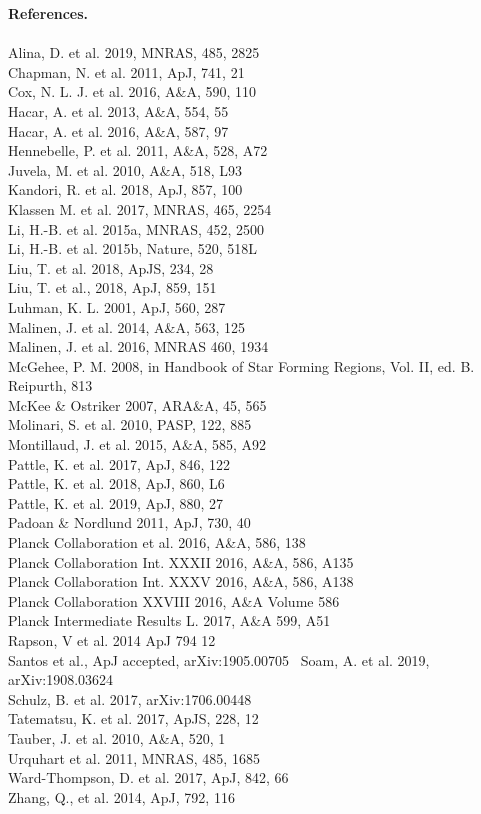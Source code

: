 \documentclass[11pt]{amsart}
\begin{document}
{{\bf References.} 
\\
\\
Alina, D. et al.  2019,  MNRAS, 485, 2825 \\
Chapman, N. et al. 2011, ApJ, 741, 21 \\
Cox, N. L. J. et al. 2016, A\&A, 590, 110 \\
Hacar, A. et al. 2013, A\&A, 554, 55 \\
Hacar, A. et al. 2016, A\&A, 587, 97 \\
Hennebelle, P. et al. 2011, A\&A, 528, A72 \\
Juvela, M.  et al. 2010, A\&A, 518, L93 \\
Kandori, R. et al. 2018, ApJ, 857, 100 \\
Klassen M. et al. 2017, MNRAS, 465, 2254 \\
Li, H.-B. et al. 2015a, MNRAS, 452, 2500 \\
Li, H.-B. et al. 2015b, Nature, 520, 518L \\
Liu, T. et al. 2018, ApJS, 234, 28 \\
Liu, T. et al., 2018,  ApJ, 859, 151 \\
Luhman, K. L. 2001, ApJ, 560, 287 \\
Malinen, J. et al. 2014, A\&A, 563, 125 \\
Malinen, J. et al. 2016, MNRAS 460, 1934 \\
McGehee, P. M. 2008, in Handbook of Star Forming Regions, Vol. II, ed. B. Reipurth, 813 \\
McKee \& Ostriker 2007, ARA\&A, 45, 565 \\
Molinari, S.  et al. 2010, PASP,  122, 885 \\
Montillaud, J. et al. 2015, A\&A, 585, A92 \\
Pattle, K.  et al. 2017, ApJ, 846, 122 \\
Pattle, K.  et al. 2018, ApJ, 860, L6 \\
Pattle, K. et al. 2019, ApJ, 880, 27 \\
Padoan \& Nordlund 2011, ApJ, 730, 40 \\
Planck Collaboration et al. 2016, A\&A, 586, 138 \\ 
Planck Collaboration Int. XXXII 2016, A\&A, 586, A135 \\
Planck Collaboration Int. XXXV 2016, A\&A, 586, A138 \\
Planck Collaboration XXVIII 2016, A\&A Volume 586 \\
Planck Intermediate Results L.  2017, A\&A 599, A51 \\
Rapson, V et al. 2014 ApJ 794 12 \\
Santos et al., ApJ accepted, arXiv:1905.00705 \
Soam, A. et al. 2019, arXiv:1908.03624\\
Schulz, B. et al. 2017, arXiv:1706.00448 \\
Tatematsu, K. et al. 2017, ApJS, 228, 12\\
Tauber, J.  et al. 2010, A\&A, 520, 1 \\
Urquhart et al. 2011, MNRAS, 485, 1685\\
Ward-Thompson, D. et al. 2017,  ApJ, 842, 66 \\
Zhang, Q., et al. 2014, ApJ, 792, 116

}
\end{document}
